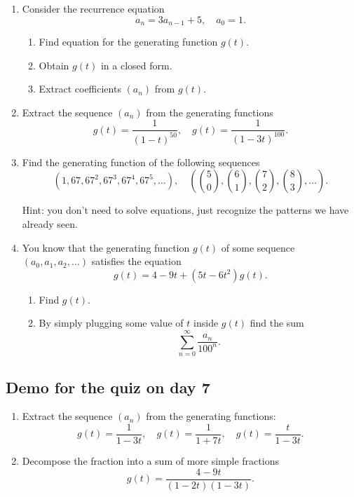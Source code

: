 \documentclass[12pt]{article}
\begin{document}

\begin{enumerate}
    \item Consider the recurrence equation 
    \[
    a_n = 3a_{n-1} + 5, \quad a_0 = 1.
    \]

    \begin{enumerate}
        \item Find equation for the generating function $g(t)$.
        \item Obtain $g(t)$ in a closed form. 
        \item Extract coefficients $(a_n)$ from $g(t)$.
    \end{enumerate}

    \item Extract the sequence $(a_n)$ from the generating functions
    \[
    g(t) = \frac{1}{(1-t)^{50}}, \quad g(t) = \frac{1}{(1-3t)^{100}}.
    \]

    \item Find the generating function of the following sequences 
    \[
    (1, 67, 67^2, 67^3, 67^4, 67^5, \dots), \quad \left({5 \choose 0}, {6 \choose 1}, {7 \choose 2}, {8 \choose 3}, \dots \right).
    \]

    Hint: you don't need to solve equations, just recognize the patterns we have already seen. 

    \item You know that the generating function $g(t)$ of some sequence $(a_0, a_1, a_2, \ldots)$ satisfies the equation 
    \[
    g(t) = 4-9t + (5t - 6t^2)g(t).
    \]
    \begin{enumerate}
        \item Find $g(t)$.
        \item By simply plugging some value of $t$ inside $g(t)$ find the sum
        \[
        \sum_{n=0}^{\infty} \frac{a_n}{100^n}.
        \]
    \end{enumerate}


\end{enumerate}

\subsection*{Demo for the quiz on day 7}

\begin{enumerate} 
    \item Extract the sequence $(a_n)$ from the generating functions:
    \[
    g(t) = \frac{1}{1 - 3t}, \quad g(t) = \frac{1}{1 + 7t}, \quad g(t) = \frac{t}{1 - 3t}.
    \]
    \item Decompose the fraction into a sum of more simple fractions
    \[
    g(t) = \frac{4 - 9t}{(1-2t)(1-3t)}.
    \]
\end{enumerate}
\end{document}
